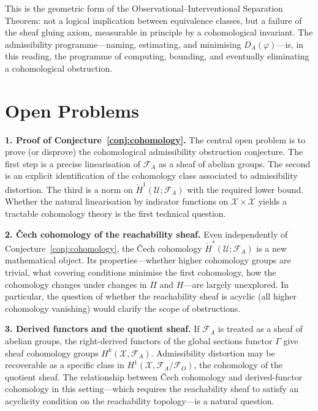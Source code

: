\documentclass[11pt, a4paper]{article}
\theoremstyle{plain}
\theoremstyle{definition}
\theoremstyle{remark}
\newcommand{\calX}{\mathcal{X}}
\newcommand{\calF}{\mathcal{F}}
\newcommand{\DA}{D_{A}(\varphi)}
\begin{document}
This is the geometric form of the Observational--Interventional Separation
Theorem: not a logical implication between equivalence classes, but a failure
of the sheaf gluing axiom, measurable in principle by a cohomological invariant.
The admissibility programme---naming, estimating, and minimising $\DA$---is,
in this reading, the programme of computing, bounding, and eventually
eliminating a cohomological obstruction.

\section{Open Problems}
\label{sec:open}

\noindent\textbf{1. Proof of Conjecture~\ref{conj:cohomology}.} The central open
problem is to prove (or disprove) the cohomological admissibility obstruction
conjecture. The first step is a precise linearisation of $\calF_A$ as a sheaf
of abelian groups. The second is an explicit identification of the cohomology
class associated to admissibility distortion. The third is a norm on
$\check{H}^1(\mathcal{U}; \calF_A)$ with the required lower bound. Whether
the natural linearisation by indicator functions on $\calX \times \calX$
yields a tractable cohomology theory is the first technical question.

\medskip
\noindent\textbf{2. \v{C}ech cohomology of the reachability sheaf.} Even
independently of Conjecture~\ref{conj:cohomology}, the \v{C}ech cohomology
$\check{H}^*(\mathcal{U}; \calF_A)$ is a new mathematical object. Its
properties---whether higher cohomology groups are trivial, what covering
conditions minimise the first cohomology, how the cohomology changes under
changes in $\Pi$ and $H$---are largely unexplored. In particular, the
question of whether the reachability sheaf is acyclic (all higher cohomology
vanishing) would clarify the scope of obstructions.

\medskip
\noindent\textbf{3. Derived functors and the quotient sheaf.} If $\calF_A$ is
treated as a sheaf of abelian groups, the right-derived functors of the
global sections functor $\Gamma$ give sheaf cohomology groups $H^k(\calX,
\calF_A)$. Admissibility distortion may be recoverable as a specific class
in $H^1(\calX, \calF_A/\calF_O)$, the cohomology of the quotient sheaf. The
relationship between \v{C}ech cohomology and derived-functor cohomology in
this setting---which requires the reachability sheaf to satisfy an acyclicity
condition on the reachability topology---is a natural question.
\end{document}

